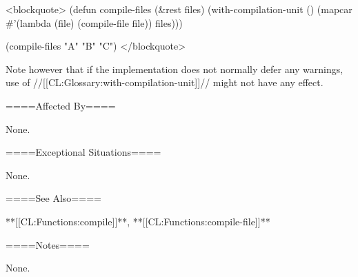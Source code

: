 <blockquote> (defun compile-files (&rest files) (with-compilation-unit () (mapcar #'(lambda (file) (compile-file file)) files)))

(compile-files "A" "B" "C") </blockquote>

Note however that if the implementation does not normally defer any warnings, use of //[[CL:Glossary:with-compilation-unit]]// might not have any effect.

====Affected By====

None.

====Exceptional Situations====

None.

====See Also====

**[[CL:Functions:compile]]**, **[[CL:Functions:compile-file]]**

====Notes====

None.


